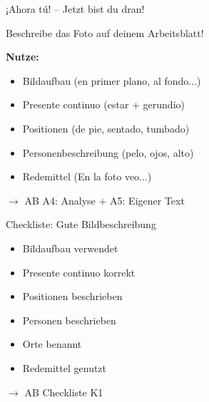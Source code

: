 \documentclass[aspectratio=169, 14pt]{beamer}
\newcommand{\abmark}[1]{\textcolor{spanisch}{$\rightarrow$ AB #1}}
\begin{document}
\begin{frame}{¡Ahora tú! – Jetzt bist du dran!}

\begin{center}
\Large

Beschreibe das Foto auf deinem Arbeitsblatt!

\vspace{1.5em}

\normalsize
\textbf{Nutze:}
\begin{itemize}
    \item Bildaufbau (en primer plano, al fondo...)
    \item Presente continuo (estar + gerundio)
    \item Positionen (de pie, sentado, tumbado)
    \item Personenbeschreibung (pelo, ojos, alto)
    \item Redemittel (En la foto veo...)
\end{itemize}

\vspace{1em}

\abmark{A4: Analyse + A5: Eigener Text}

\end{center}

\end{frame}

\begin{frame}{Checkliste: Gute Bildbeschreibung}

\begin{center}
\Large

\begin{itemize}
    \item[$\square$] Bildaufbau verwendet
    \item[$\square$] Presente continuo korrekt
    \item[$\square$] Positionen beschrieben
    \item[$\square$] Personen beschrieben
    \item[$\square$] Orte benannt
    \item[$\square$] Redemittel genutzt
\end{itemize}

\vspace{1em}

\normalsize
\abmark{Checkliste K1}

\end{center}

\end{frame}
\end{document}
